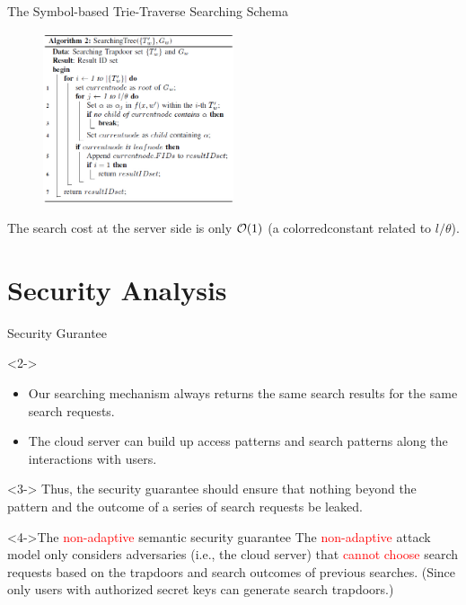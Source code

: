 \documentclass[handout]{beamer}
\begin{document}
\begin{frame}{The Symbol-based Trie-Traverse Searching Schema}
	\begin{figure}
		\includegraphics[width=0.5\textwidth]{algo2.jpg}
	\end{figure}
     The search cost at the server side is only \textcolor{red}{${\cal O}(1)$} (a \text	color{red}{constant} related to $l/\theta$).
\end{frame}

\section{Security Analysis}

\begin{frame}{Security Gurantee}
	\begin{block}<2->{}
		\begin{itemize}
			\item Our searching mechanism always returns the \textcolor{bazaar}{same} search results for the \textcolor{bazaar}{same} search requests.
			\item The cloud server can build up \textcolor[rgb]{0.0, 0.26, 0.15}{access patterns} and \textcolor[rgb]{0.0, 0.26, 0.15}{search patterns} along the interactions with users.
		\end{itemize}
	\end{block}
	
	\begin{alertblock}<3->{}
		Thus, the security guarantee should ensure that nothing beyond the \textcolor[rgb]{0.0, 0.26, 0.15}{pattern} and
		\textcolor[rgb]{0.0, 0.26, 0.15}{the outcome of a series of search requests} be leaked.
	\end{alertblock}
	\begin{block}<4->{The \textcolor{red}{non-adaptive} semantic security guarantee}
		The \textcolor{red}{non-adaptive} attack model only considers adversaries (i.e., the cloud server) that \textcolor{red}{cannot choose} search requests based on the trapdoors and search outcomes of previous searches. (Since only users with authorized secret keys can generate search trapdoors.)
	\end{block}
\end{frame}
\end{document}
